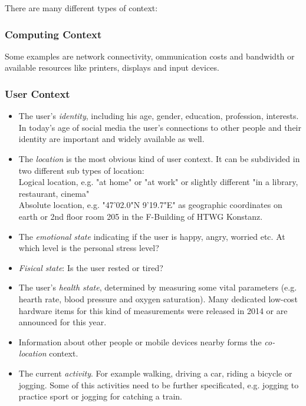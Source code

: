 There are many different types of context: 

\subsubsection*{Computing Context}

Some examples are network connectivity, ommunication costs and bandwidth or available resources like printers, displays and input devices.

\subsubsection*{User Context}

\begin{itemize}
\item The user's \emph{identity}, including his age, gender, education, profession, interests. In today's age of social media the user's connections to other people and their identity are important and widely available as well.
\item The \emph{location} is the most obvious kind of user context. It can be subdivided in two different sub types of location: \\
  Logical location, e.g. "at home" or "at work" or slightly different "in a library, restaurant, cinema"\\
  Absolute location, e.g. "47'02.0"N 9'19.7"E" as geographic coordinates on earth or 2nd floor room 205 in the F-Building of HTWG Konstanz.
\item The \emph{emotional state} indicating if the user is happy, angry, worried etc. At which level is the personal stress level?
\item \emph{Fisical state}: Is the user rested or tired?
\item The user's \emph{health state}, determined by measuring some vital parameters (e.g. hearth rate, blood pressure and oxygen saturation). Many  dedicated low-cost hardware items for this kind of measurements were released in 2014 or are announced for this year. 
\item Information about other people or mobile devices nearby forms the \emph{co-location} context.
\item The current \emph{activity}. For example walking, driving a car, riding a bicycle or jogging. Some of this activities need to be further specificated, e.g. jogging to practice sport or jogging for catching a train.
\end{itemize}

